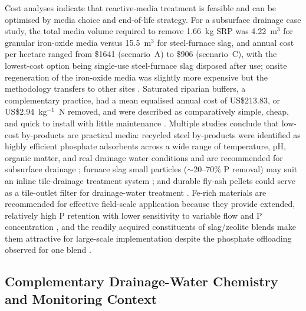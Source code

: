 \documentclass[11pt]{article}
\begin{document}
Cost analyses indicate that reactive-media treatment is feasible and can be
optimised by media choice and end-of-life strategy. For a subsurface drainage
case study, the total media volume required to remove 1.66~kg SRP was 4.22~m$^3$
for granular iron-oxide media versus 15.5~m$^3$ for steel-furnace slag, and annual
cost per hectare ranged from \$1641 (scenario~A) to \$906 (scenario~C), with the
lowest-cost option being single-use steel-furnace slag disposed after use; onsite
regeneration of the iron-oxide media was slightly more expensive but the
methodology transfers to other sites \parencite{Hauda2020}. Saturated riparian
buffers, a complementary practice, had a mean equalised annual cost of
US\$213.83, or US\$2.94~kg$^{-1}$~N removed, and were described as comparatively
simple, cheap, and quick to install with little maintenance
\parencite{Jaynes2019}. Multiple studies conclude that low-cost by-products are
practical media: recycled steel by-products were identified as highly efficient
phosphate adsorbents across a wide range of temperature, pH, organic matter, and
real drainage water conditions and are recommended for subsurface drainage
\parencite{Sellner2019b}; furnace slag small particles ($\sim$20--70\% P removal)
may suit an inline tile-drainage treatment system \parencite{Sanford2016}; and
durable fly-ash pellets could serve as a tile-outlet filter for drainage-water
treatment \parencite{Li2017}. Fe-rich materials are recommended for effective
field-scale application because they provide extended, relatively high P retention
with lower sensitivity to variable flow and P concentration
\parencite{Pugliese2023}, and the readily acquired constituents of slag/zeolite
blends make them attractive for large-scale implementation despite the phosphate
offloading observed for one blend \parencite{Agrawal2011b}.

\subsection{Complementary Drainage-Water Chemistry and Monitoring Context}
\end{document}
